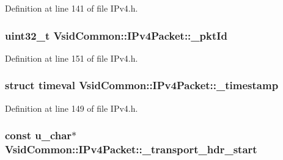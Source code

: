 Definition at line 141 of file I\-Pv4.\-h.

\hypertarget{class_vsid_common_1_1_i_pv4_packet_a5967fced67bba49307c5f7de667b1ba4}{
\subsubsection[{\-\_\-pkt\-Id}]{\setlength{\rightskip}{0pt plus 5cm}uint32\-\_\-t Vsid\-Common\-::\-I\-Pv4\-Packet\-::\-\_\-pkt\-Id\hspace{0.3cm}{\ttfamily [protected]}}}\label{class_vsid_common_1_1_i_pv4_packet_a5967fced67bba49307c5f7de667b1ba4}


Definition at line 151 of file I\-Pv4.\-h.

\hypertarget{class_vsid_common_1_1_i_pv4_packet_af9fee09107ca0376a36f307256f54df3}{
\subsubsection[{\-\_\-timestamp}]{\setlength{\rightskip}{0pt plus 5cm}struct timeval Vsid\-Common\-::\-I\-Pv4\-Packet\-::\-\_\-timestamp\hspace{0.3cm}{\ttfamily [protected]}}}\label{class_vsid_common_1_1_i_pv4_packet_af9fee09107ca0376a36f307256f54df3}


Definition at line 149 of file I\-Pv4.\-h.

\hypertarget{class_vsid_common_1_1_i_pv4_packet_adb6dc95e430636380d1f068dc4708def}{
\subsubsection[{\-\_\-transport\-\_\-hdr\-\_\-start}]{\setlength{\rightskip}{0pt plus 5cm}const u\-\_\-char$\ast$ Vsid\-Common\-::\-I\-Pv4\-Packet\-::\-\_\-transport\-\_\-hdr\-\_\-start\hspace{0.3cm}{\ttfamily [protected]}}}\label{class_vsid_common_1_1_i_pv4_packet_adb6dc95e430636380d1f068dc4708def}


